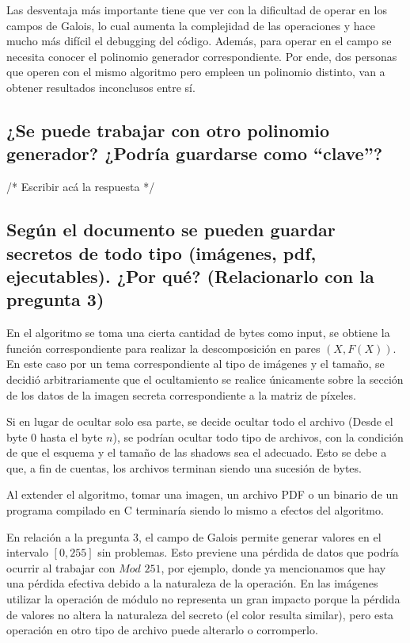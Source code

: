 \documentclass[11pt]{scrartcl} %
\begin{document}
Las desventaja más importante tiene que ver con la dificultad de operar en los campos de Galois, lo cual aumenta la complejidad de las operaciones y hace mucho más difícil el debugging del código. Además, para operar en el campo se necesita conocer el polinomio generador correspondiente. Por ende, dos personas que operen con el mismo algoritmo pero empleen un polinomio distinto, van a obtener resultados inconclusos entre sí.


\subsection{¿Se puede trabajar con otro polinomio generador? ¿Podría guardarse como “clave”?}

/* Escribir acá la respuesta */


\subsection{Según el documento se pueden guardar secretos de todo tipo (imágenes, pdf, ejecutables). ¿Por qué? (Relacionarlo con la pregunta 3)}

En el algoritmo se toma una cierta cantidad de bytes como input, se obtiene la función correspondiente para realizar la descomposición en pares $(X, F(X))$. En este caso por un tema correspondiente al tipo de imágenes y el tamaño, se decidió arbitrariamente que el ocultamiento se realice únicamente sobre la sección de los datos de la imagen secreta correspondiente a la matriz de píxeles.

Si en lugar de ocultar solo esa parte, se decide ocultar todo el archivo (Desde el byte $0$ hasta el byte $n$), se podrían ocultar todo tipo de archivos, con la condición de que el esquema y el tamaño de las shadows sea el adecuado. Esto se debe a que, a fin de cuentas, los archivos terminan siendo una sucesión de bytes.

Al extender el algoritmo, tomar una imagen, un archivo PDF o un binario de un programa compilado en C terminaría siendo lo mismo a efectos del algoritmo.

En relación a la pregunta 3, el campo de Galois permite generar valores en el intervalo $[0, 255]$ sin problemas. Esto previene una pérdida de datos que podría ocurrir al trabajar con $Mod$ $251$, por ejemplo, donde ya mencionamos que hay una pérdida efectiva debido a la naturaleza de la operación. En las imágenes utilizar la operación de módulo no representa un gran impacto porque la pérdida de valores no altera la naturaleza del secreto (el color resulta similar), pero esta operación en otro tipo de archivo puede alterarlo o corromperlo.
\end{document}
